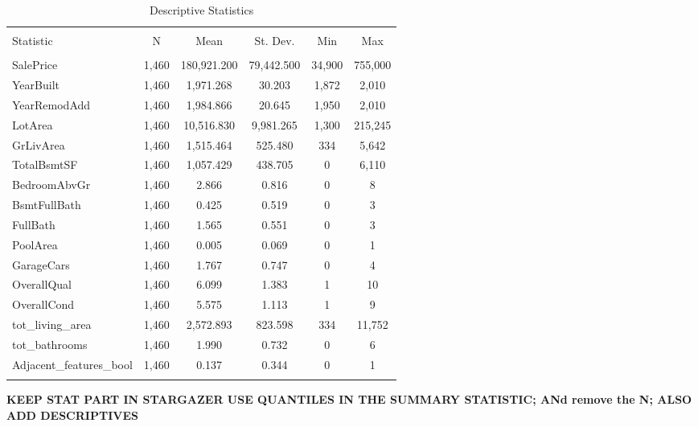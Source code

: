 \documentclass{article}
\begin{document}
\begin{center}
\begin{table}[!htbp] \centering 
  \caption{Descriptive Statistics} 
  \label{} 
\begin{tabular}{@{\extracolsep{5pt}}lccccc} 
\\[-1.8ex]\hline 
\hline \\[-1.8ex] 
Statistic & \multicolumn{1}{c}{N} & \multicolumn{1}{c}{Mean} & \multicolumn{1}{c}{St. Dev.} & \multicolumn{1}{c}{Min} & \multicolumn{1}{c}{Max} \\ 
\hline \\[-1.8ex] 
SalePrice & 1,460 & 180,921.200 & 79,442.500 & 34,900 & 755,000 \\ 
YearBuilt & 1,460 & 1,971.268 & 30.203 & 1,872 & 2,010 \\ 
YearRemodAdd & 1,460 & 1,984.866 & 20.645 & 1,950 & 2,010 \\ 
LotArea & 1,460 & 10,516.830 & 9,981.265 & 1,300 & 215,245 \\ 
GrLivArea & 1,460 & 1,515.464 & 525.480 & 334 & 5,642 \\ 
TotalBsmtSF & 1,460 & 1,057.429 & 438.705 & 0 & 6,110 \\ 
BedroomAbvGr & 1,460 & 2.866 & 0.816 & 0 & 8 \\ 
BsmtFullBath & 1,460 & 0.425 & 0.519 & 0 & 3 \\ 
FullBath & 1,460 & 1.565 & 0.551 & 0 & 3 \\ 
PoolArea & 1,460 & 0.005 & 0.069 & 0 & 1 \\ 
GarageCars & 1,460 & 1.767 & 0.747 & 0 & 4 \\ 
OverallQual & 1,460 & 6.099 & 1.383 & 1 & 10 \\ 
OverallCond & 1,460 & 5.575 & 1.113 & 1 & 9 \\ 
tot\_living\_area & 1,460 & 2,572.893 & 823.598 & 334 & 11,752 \\ 
tot\_bathrooms & 1,460 & 1.990 & 0.732 & 0 & 6 \\ 
Adjacent\_features\_bool & 1,460 & 0.137 & 0.344 & 0 & 1 \\ 
\hline \\[-1.8ex] 
\end{tabular} 
\end{table} 
\end{center}

\textbf{KEEP STAT PART IN STARGAZER USE QUANTILES IN THE SUMMARY STATISTIC; ANd remove the N; ALSO ADD DESCRIPTIVES}
\end{document}
